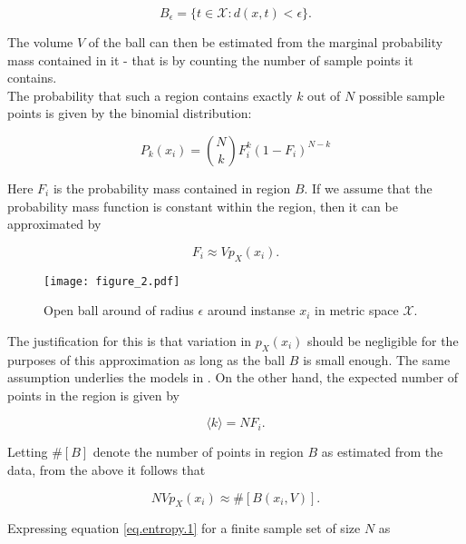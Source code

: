 \documentclass[12pt]{extarticle}
\begin{document}
\begin{equation}
B_{\epsilon}=\{ t \in \mathcal{X}: d(x,t) <\epsilon \}.
\end{equation}

\noindent
The volume $V$ of the ball can then be estimated from the marginal probability mass contained in it - that is %
by counting the number of %
sample points it contains.\\

\noindent
The probability that such a region contains exactly $k$ out of $N$ possible sample points is given by the binomial distribution:

\begin{equation}
P_k(x_i) = \binom{N}{k}F_i^k(1-F_i)^{N-k}
\label{binom.k.no.pts}
\end{equation}

\noindent
Here $F_i$ is the probability mass contained in region $B$. If we
assume that the probability mass function is constant within the
region, then it can be approximated by

\begin{equation} 
F_i \approx Vp_X(x_i).
\end{equation}

\begin{figure}[H]
	\centering
	\texttt{[image: figure\_2.pdf]}
    \caption{Open ball around of radius $\epsilon$ around instanse $x_i$ in metric space $\mathcal{X}$.}
\end{figure}

\noindent
The justification for this is that variation in $p_X(x_i)$ should be
negligible for the purposes of this approximation as long as the ball
$B$ is small enough. The same assumption underlies the models in
\cite{Kozachenko-Leonenko,Kraskov}. On the other hand, the expected number of points in
the region is given by

\begin{equation}
\langle k \rangle = NF_i.
\label{eq.<k>=NF_i}
\end{equation}

\noindent
Letting $\#[B]$ denote the number of points in region $B$ as estimated from the data, from the above it follows that

\begin{equation} 
NVp_X(x_i) \approx \#[B(x_i,V)].
\label{prob.approx.eq}
\end{equation}

\noindent
Expressing equation \ref{eq.entropy.1} for a finite sample set of size $N$ as 
\end{document}
